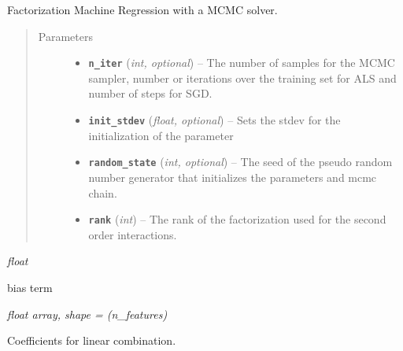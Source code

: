 \documentclass[letterpaper,10pt,english]{sphinxmanual}
\begin{document}
\begin{fulllineitems}
\label{api:fastFM.mcmc.FMRegression}
Factorization Machine Regression with a MCMC solver.
\begin{quote}\begin{description}
\item[{Parameters}] \leavevmode\begin{itemize}
\item {} 
\textbf{\texttt{n\_iter}} (\emph{int, optional}) -- The number of samples for the MCMC sampler, number or iterations over
the training set for ALS and number of steps for SGD.

\item {} 
\textbf{\texttt{init\_stdev}} (\emph{float, optional}) -- Sets the stdev  for the initialization of the parameter

\item {} 
\textbf{\texttt{random\_state}} (\emph{int, optional}) -- The seed of the pseudo random number generator that
initializes the parameters and mcmc chain.

\item {} 
\textbf{\texttt{rank}} (\emph{int}) -- The rank of the factorization used for the second order interactions.

\end{itemize}

\end{description}\end{quote}

\begin{fulllineitems}
\label{api:fastFM.mcmc.FMRegression.w0_}
\emph{float}

bias term

\end{fulllineitems}


\begin{fulllineitems}
\label{api:fastFM.mcmc.FMRegression.w_}
\emph{float \textbar{} array, shape = (n\_features)}

Coefficients for linear combination.

\end{fulllineitems}


\end{fulllineitems}
\end{document}
